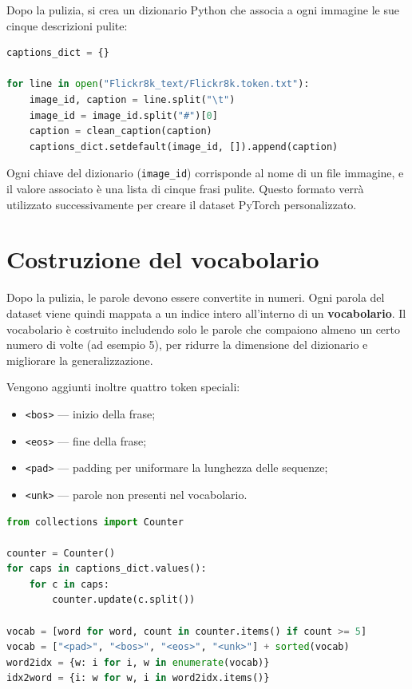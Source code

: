 \documentclass[11pt,a4paper]{report}
\newcommand{\bos}{\texttt{<bos>}}
\newcommand{\eos}{\texttt{<eos>}}
\newcommand{\pad}{\texttt{<pad>}}
\newcommand{\unk}{\texttt{<unk>}}
\begin{document}
Dopo la pulizia, si crea un dizionario Python che associa a ogni immagine le sue cinque descrizioni pulite:

\begin{lstlisting}[language=Python, caption={Creazione del dizionario delle caption.}]
captions_dict = {}

for line in open("Flickr8k_text/Flickr8k.token.txt"):
    image_id, caption = line.split("\t")
    image_id = image_id.split("#")[0]
    caption = clean_caption(caption)
    captions_dict.setdefault(image_id, []).append(caption)
\end{lstlisting}

\begin{tcolorbox}[title=Struttura del dizionario]
Ogni chiave del dizionario (\texttt{image\_id}) corrisponde al nome di un file immagine, e il valore associato è una lista di cinque frasi pulite.  
Questo formato verrà utilizzato successivamente per creare il dataset PyTorch personalizzato.
\end{tcolorbox}

\section{Costruzione del vocabolario}

Dopo la pulizia, le parole devono essere convertite in numeri.  
Ogni parola del dataset viene quindi mappata a un indice intero all’interno di un \textbf{vocabolario}.  
Il vocabolario è costruito includendo solo le parole che compaiono almeno un certo numero di volte (ad esempio 5), per ridurre la dimensione del dizionario e migliorare la generalizzazione.

Vengono aggiunti inoltre quattro token speciali:
\begin{itemize}
  \item \bos{} — inizio della frase;
  \item \eos{} — fine della frase;
  \item \pad{} — padding per uniformare la lunghezza delle sequenze;
  \item \unk{} — parole non presenti nel vocabolario.
\end{itemize}

\begin{lstlisting}[language=Python, caption={Costruzione del vocabolario.}]
from collections import Counter

counter = Counter()
for caps in captions_dict.values():
    for c in caps:
        counter.update(c.split())

vocab = [word for word, count in counter.items() if count >= 5]
vocab = ["<pad>", "<bos>", "<eos>", "<unk>"] + sorted(vocab)
word2idx = {w: i for i, w in enumerate(vocab)}
idx2word = {i: w for w, i in word2idx.items()}
\end{lstlisting}
\end{document}
